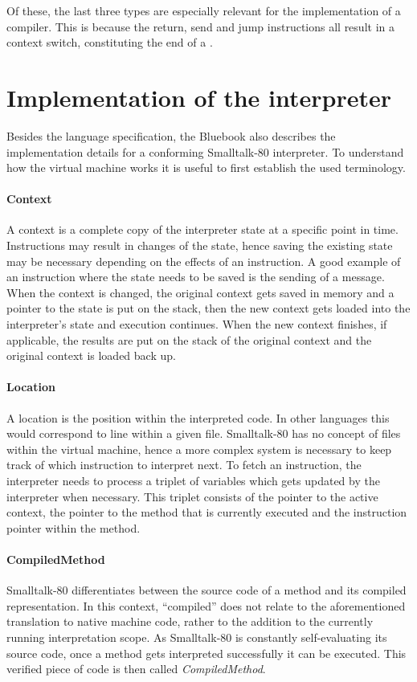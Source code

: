 Of these, the last three types are especially relevant for the implementation of a \jit{} compiler. 
This is because the return, send and jump instructions all result in a context switch, constituting the end of a \bb{}.

\section{Implementation of the interpreter}
Besides the language specification, the Bluebook also describes the implementation details for a conforming Smalltalk-80 interpreter. 
To understand how the virtual machine works it is useful to first establish the used terminology. 

\paragraph{Context}
A context is a complete copy of the interpreter state at a specific point in time. Instructions may result in changes of the state, hence saving the existing state may be necessary depending on the effects of an instruction. 
A good example of an instruction where the state needs to be saved is the sending of a message. 
When the context is changed, the original context gets saved in memory and a pointer to the state is put on the stack, then the new context gets loaded into the interpreter's state and execution continues. When the new context finishes, if applicable, the results are put on the stack of the original context and the original context is loaded back up.

\paragraph{Location} 
A location is the position within the interpreted code. In other languages this would correspond to line within a given file.
Smalltalk-80 has no concept of files within the virtual machine, hence a more complex system is necessary to keep track of which instruction to interpret next.
To fetch an instruction, the interpreter needs to process a triplet of variables which gets updated by the interpreter when necessary. 
This triplet consists of the pointer to the active context, the pointer to the method that is currently executed and the instruction pointer within the method.

\paragraph{CompiledMethod}
Smalltalk-80 differentiates between the source code of a method and its compiled representation. In this context, \enquote{compiled} does not relate to the aforementioned translation to native machine code, rather to the addition to the currently running interpretation scope. As Smalltalk-80 is constantly self-evaluating its source code, once a method gets interpreted successfully it can be executed. This verified piece of code is then called \emph{CompiledMethod}.

